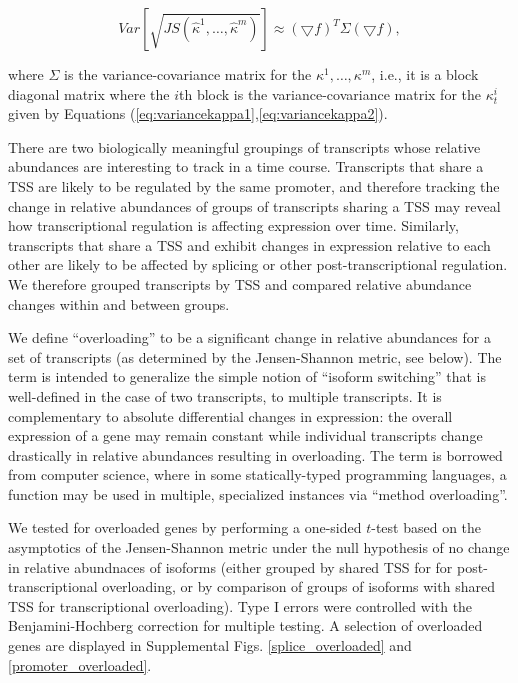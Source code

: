 \documentclass[12pt]{amsart}
\theoremstyle{definition}
\begin{document}
\begin{equation}
Var[\sqrt{JS(\hat{\kappa}^1,\ldots,\hat{\kappa}^m)}] \approx (\bigtriangledown f)^T \Sigma (\bigtriangledown f),
\end{equation}

where $\Sigma$ is the variance-covariance matrix for the
$\kappa^1,\ldots,\kappa^m$, i.e., it is a block diagonal matrix where the
$i$th block is the variance-covariance matrix for the $\kappa^i_t$ given by
Equations (\ref{eq:variancekappa1},\ref{eq:variancekappa2}).


There are two biologically meaningful groupings of transcripts whose
relative abundances are interesting to track in a
time course. Transcripts that share a TSS are likely to be regulated by
the same promoter, and therefore tracking the change in relative
abundances of groups of transcripts sharing a TSS may reveal how
transcriptional regulation is affecting expression over
time. Similarly, transcripts that share a TSS and exhibit changes in
expression relative to each other are likely to be affected by
splicing or other post-transcriptional regulation. We therefore
grouped transcripts by TSS and compared relative abundance changes
within and between groups. 

We define ``overloading'' to be a significant change in relative
abundances for a set of transcripts (as determined by the Jensen-Shannon metric, see below). The term is intended to generalize the simple notion of
``isoform switching'' that is well-defined in the case of two
transcripts, to multiple transcripts. It is complementary to absolute
differential changes in expression: the overall expression of a gene
may remain constant while individual transcripts change drastically in
relative abundances resulting in overloading. The term is borrowed from
computer science, where in some statically-typed programming
languages, a function may be used in multiple, specialized instances
via ``method overloading''. 

We tested for overloaded genes by performing a one-sided $t$-test based on the asymptotics of the Jensen-Shannon metric under the null hypothesis of no change in relative abundnaces of isoforms (either grouped by shared TSS for for post-transcriptional overloading, or by comparison of groups of isoforms with shared TSS for transcriptional overloading). Type I errors were controlled with the Benjamini-Hochberg \cite{Benjamini1995} correction for multiple testing. 
 A selection of overloaded genes are displayed in Supplemental Figs. \ref{splice_overloaded} and \ref{promoter_overloaded}.
\end{document}

